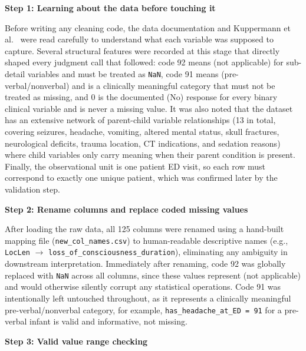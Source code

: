 \documentclass[11pt,letterpaper]{article}
\begin{document}
\textbf{Step 1: Learning about the data before touching it}

Before writing any cleaning code, the data documentation and Kuppermann et al.~\cite{kuppermann2009} were read carefully to understand what each variable was supposed to capture. Several structural features were recorded at this stage that directly shaped every judgment call that followed: code 92 means (not applicable) for sub-detail variables and must be treated as \texttt{NaN}, code 91 means (pre-verbal/nonverbal) and is a clinically meaningful category that must not be treated as missing, and 0 is the documented (No) response for every binary clinical variable and is never a missing value. It was also noted that the dataset has an extensive network of parent-child variable relationships (13 in total, covering seizures, headache, vomiting, altered mental status, skull fractures, neurological deficits, trauma location, CT indications, and sedation reasons) where child variables only carry meaning when their parent condition is present. Finally, the observational unit is one patient ED visit, so each row must correspond to exactly one unique patient, which was confirmed later by the validation step.

\textbf{Step 2: Rename columns and replace coded missing values}

After loading the raw data, all 125 columns were renamed using a hand-built mapping file (\texttt{new\_col\_names.csv}) to human-readable descriptive names (e.g., \texttt{LocLen} $\rightarrow$ \texttt{loss\_of\_consciousness\_duration}), eliminating any ambiguity in downstream interpretation. Immediately after renaming, code 92 was globally replaced with \texttt{NaN} across all columns, since these  values represent (not applicable) and would otherwise silently corrupt any statistical operations. Code 91 was intentionally left untouched throughout, as it represents a clinically meaningful pre-verbal/nonverbal category, for example, \texttt{has\_headache\_at\_ED = 91} for a pre-verbal infant is valid and informative, not missing.

\textbf{Step 3: Valid value range checking}
\end{document}
